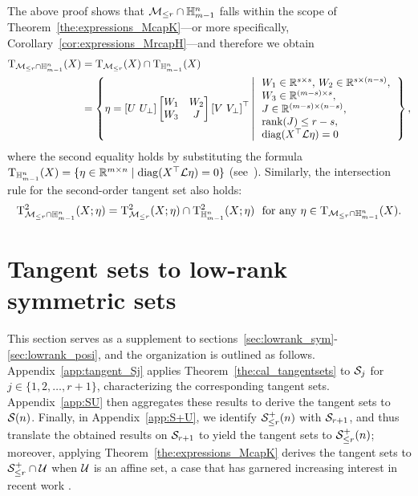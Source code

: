 The above proof shows that $\mathcal{M}_{\le r} \cap \mathbb{H}^n_{m-1}$ falls within the scope of Theorem~\ref{the:expressions_McapK}---or more specifically, Corollary~\ref{cor:expressions_MrcapH}---and therefore we obtain
\begin{equation*}
\begin{aligned}
\mathrm{T}_{\mathcal{M}_{\le r}\cap\mathbb{H}^n_{m-1}}(X)&= \mathrm{T}_{\mathcal{M}_{\le r}}(X)\cap\mathrm{T}_{\mathbb{H}^n_{m-1}}(X)
\\
&=\left\{ {\eta = \left[ U\,\,U_{\bot} \right] \left[ \begin{matrix}
W_1 &		W_2\\
W_3&		J\\
\end{matrix} \right] \left[ V\,\,V_{\bot} \right] ^{\top}\left|\,\begin{array}{l}
W_1\in\mathbb{R}^{s\times s},\, W_2\in\mathbb{R} ^{s\times \left( n-s \right)},
\\
W_3\in\mathbb{R} ^{\left( m-s \right) \times s},
\\
J\in \mathbb{R}^{\left( m-s \right) \times \left( n-s \right)},
\\
\operatorname{rank}(J)\le r-s,
\\
\operatorname{diag}(X^\top\mathcal{L} \eta) = 0
\end{array}
\right.} \right\},
\end{aligned}
\end{equation*}
where the second equality holds by substituting the formula $\mathrm{T}_{\mathbb{H}^n_{m-1}}(X)=\{\eta\in\mathbb{R}^{m\times n}\mid \operatorname{diag}(X^\top\mathcal{L} \eta)= {0}\}$ (see~\cite{nickel2018learninghierarchieslorentz}). Similarly, the intersection rule for the second-order tangent set also holds: 
\begin{equation*}
\tangenttwo_{\boundedrank\cap\matrixhyperboloid}(X;\eta) = \tangenttwo_{\boundedrank}(X;\eta)\cap\tangenttwo_{\matrixhyperboloid}(X;\eta)\ \ \text{for any}\ \eta\in\Btangent_{\boundedrank\cap\matrixhyperboloid}(X).
\end{equation*}





\section{Tangent sets to low-rank symmetric sets}\label{app:lowranksym}
This section serves as a supplement to sections~\ref{sec:lowrank_sym}-\ref{sec:lowrank_posi}, and the organization is outlined as follows. Appendix~\ref{app:tangent_Sj} applies Theorem~\ref{the:cal_tangentsets} to $\mathcal{S}_j$ for $j \in \{1,2,\ldots,r+1\}$, characterizing the corresponding tangent sets. Appendix~\ref{app:SU} then aggregates these results to derive the tangent sets to $\mathcal{S}(n)$. Finally, in Appendix~\ref{app:S+U}, we identify $\mathcal{S}^+_{\le r}(n)$ with $\mathcal{S}_{r+1}$, and thus translate the obtained results on $\mathcal{S}_{r+1}$ to yield the tangent sets to $\mathcal{S}^+_{\le r}(n)$; moreover, applying Theorem~\ref{the:expressions_McapK} derives the tangent sets to $\mathcal{S}^+_{\le r} \cap \mathcal{U}$ when $\mathcal{U}$ is an affine set, a case that has garnered increasing interest in recent work \cite{boumal2020deterministic,levin2025effect}.

